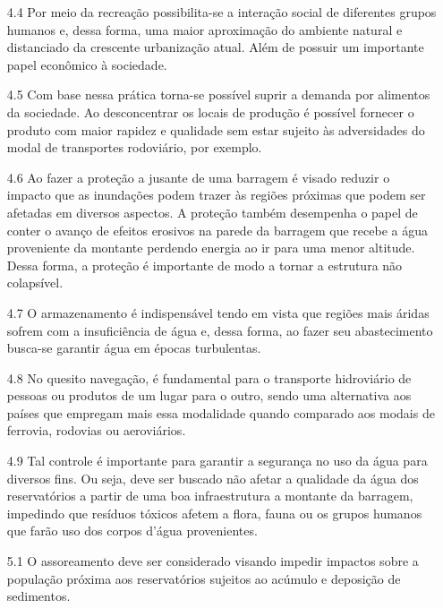 \documentclass[a4paper, 12pt]{article}
\begin{document}
\begin{enumerate}
        \item[4.4] Por meio da recreação possibilita-se a interação social de diferentes grupos humanos e, dessa forma, uma maior aproximação do ambiente natural e distanciado da crescente urbanização atual. Além de possuir um importante papel econômico à sociedade.
        
        \item[4.5] Com base nessa prática torna-se possível suprir a demanda por alimentos da sociedade. Ao desconcentrar os locais de produção é possível fornecer o produto com maior rapidez e qualidade sem estar sujeito às adversidades do modal de transportes rodoviário, por exemplo.
        
        \item[4.6] Ao fazer a proteção a jusante de uma barragem é visado reduzir o impacto que as inundações podem trazer às regiões próximas que podem ser afetadas em diversos aspectos. A proteção também desempenha o papel de conter o avanço de efeitos erosivos na parede da barragem que recebe a água proveniente da montante perdendo energia ao ir para uma menor altitude. Dessa forma, a proteção é importante de modo a tornar a estrutura não colapsível. 
        
        \item[4.7] O armazenamento é indispensável tendo em vista que regiões mais áridas sofrem com a insuficiência de água e, dessa forma, ao fazer seu abastecimento busca-se garantir água em épocas turbulentas.
        
        \item[4.8] No quesito navegação, é fundamental para o transporte hidroviário de pessoas ou produtos de um lugar para o outro, sendo uma alternativa aos países que empregam mais essa modalidade quando comparado aos modais de ferrovia, rodovias ou aeroviários.
        
        \item[4.9] Tal controle é importante para garantir a segurança no uso da água para diversos fins. Ou seja, deve ser buscado não afetar a qualidade da água dos reservatórios a partir de uma boa infraestrutura a montante da barragem, impedindo que resíduos tóxicos afetem a flora, fauna ou os grupos humanos que farão uso dos corpos d'água provenientes.
        
        \item[5.1] O assoreamento deve ser considerado visando impedir impactos sobre a população próxima aos reservatórios sujeitos ao acúmulo e deposição de sedimentos.
        

\end{enumerate}
\end{document}

